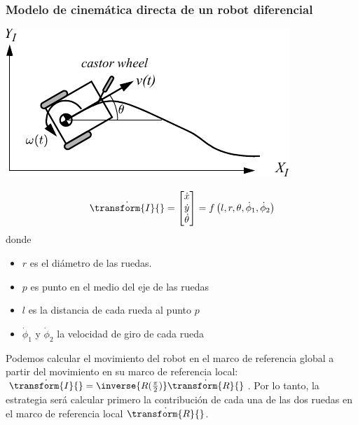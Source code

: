 \begin{frame}
    \frametitle{Modelo de cinemática directa de un robot diferencial}
    \footnotesize
    \begin{center}
        \includegraphics[width=0.4\columnwidth]{./images/differential_drive.pdf}
    \end{center}


    \begin{equation*}
        \dot{\transform{I}{}} =
        \begin{bmatrix}
            \dot{x}\\
            \dot{y}\\
            \dot{\theta}
        \end{bmatrix} =
        f\left( l,r,\theta,\dot{\phi}_{1},\dot{\phi}_{2}\right)
    \end{equation*}
    donde
    \begin{itemize}
        \item $r$ es el diámetro de las ruedas.
        \item $p$ es punto en el medio del eje de las ruedas
        \item $l$ es la distancia de cada rueda al punto $p$
        \item $\dot{\phi}_{1}$ y $\dot{\phi}_{2}$ la velocidad de giro de cada rueda
    \end{itemize}

    Podemos calcular el movimiento del robot en el marco de referencia global a partir del movimiento en su marco de referencia local:  $\dot{\transform{I}{}} = \inverse{R(\frac{\pi}{2})}\dot{\transform{R}{}}$. Por lo tanto, la estrategia será calcular primero la contribución de cada una de las dos ruedas en el marco de referencia local $\dot{\transform{R}{}}$.
\end{frame}

